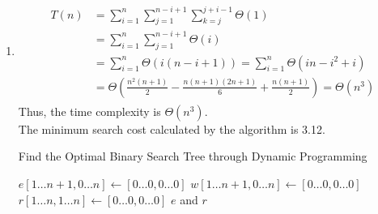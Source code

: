 \documentclass[12pt,a4paper]{article}
\makeatletter
\newtheorem*{solution}{Solution}
\theoremstyle{definition}
\renewenvironment{solution}[1][Solution] {\par\pushQED{\qed}\normalfont\topsep6\p@\@plus6\p@\relax\trivlist\item[\hskip\labelsep\bfseries#1\@addpunct{.}]\ignorespaces}{\popQED\endtrivlist\@endpefalse} \makeatother
\makeatother
\begin{document}
\begin{enumerate}
\begin{solution}
\begin{enumerate}
            \begin{align*}
                \begin{split}
                    T(n) &= \sum_{i=1}^{n}\sum_{j=1}^{n-i+1}\sum_{k=j}^{j+i-1} \Theta(1)\\
                    & = \sum_{i=1}^{n}\sum_{j=1}^{n-i+1} \Theta(i)\\
                    & = \sum_{i=1}^{n} \Theta(i(n-i+1)) = \sum_{i=1}^{n} \Theta(in - i^2+i)\\  
                    &= \Theta(\frac{n^2(n+1)}{2}-\frac{n(n+1)(2n+1)}{6}+\frac{n(n+1)}{2}) = \Theta(n^3)
                \end{split}
            \end{align*}
            Thus, the time complexity is $\Theta(n^3)$.\\
            The minimum search cost calculated by the algorithm is 3.12.
            
            \begin{minipage}[t]{0.8\textwidth}
            \begin{algorithm}[H]
            		
            \BlankLine
            \caption{Find the Optimal Binary Search Tree through Dynamic Programming}
            \label{tree-dp}
            $e[1\dots n+1,0\dots n]\leftarrow [0\dots 0,0\dots 0]$\;
            $w[1\dots n+1,0\dots n]\leftarrow [0\dots 0,0\dots 0]$\;
            $r[1\dots n,1\dots n]\leftarrow [0\dots 0,0\dots 0]$\;
            \Return $e$ and $r$\;
            \end{algorithm}
            \end{minipage}
            

\end{enumerate}
\end{solution}
\end{enumerate}
\end{document}
